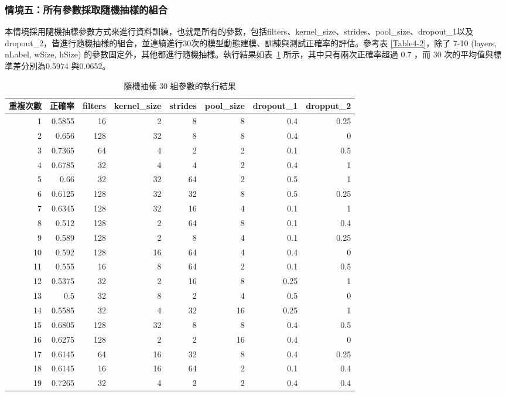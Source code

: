 \documentclass[12pt, a4paper]{article} 				%
\begin{document}
\subsubsection{情境五：所有參數採取隨機抽樣的組合}
本情境採用隨機抽樣參數方式來進行資料訓練，也就是所有的參數，包括filters、kernel\_size、strides、pool\_size、dropout\_1以及dropout\_2，皆進行隨機抽樣的組合，並連續進行30次的模型動態建模、訓練與測試正確率的評估。參考表 \ref{Table4-2}，除了 7-10  (layers, nLabel, wSize, hSize) 的參數固定外，其他都進行隨機抽樣。執行結果如表~\ref{Table4-9} 所示，其中只有兩次正確率超過 0.7 ，而 30 次的平均值與標準差分別為0.5974 與0.0652。

\begin{table}
\begin{center}
\caption{隨機抽樣 30 組參數的執行結果}\label{Table4-9}
\begin{tabular}{rrrrrrrr}\toprule
重複次數	&	正確率	&	filters	&	kernel\_size	&	strides	&	pool\_size	&	dropout\_1	&	dropput\_2	\\\midrule
1	&	0.5855	&	16	&	2	&	8	&	8	&	0.4	&	0.25	\\
2	&	0.656	&	128	&	32	&	8	&	8	&	0.4	&	0	\\
3	&	0.7365	&	64	&	4	&	2	&	2	&	0.1	&	0.5	\\
4	&	0.6785	&	32	&	4	&	4	&	2	&	0.4	&	1	\\
5	&	0.66	&	32	&	32	&	64	&	2	&	0.5	&	1	\\
6	&	0.6125	&	128	&	32	&	32	&	8	&	0.5	&	0.25	\\
7	&	0.6345	&	128	&	32	&	16	&	4	&	0.1	&	1	\\
8	&	0.512	&	128	&	2	&	64	&	8	&	0.1	&	0.4	\\
9	&	0.589	&	128	&	2	&	8	&	4	&	0.1	&	0.25	\\
10	&	0.592	&	128	&	16	&	64	&	4	&	0.4	&	0	\\
11	&	0.555	&	16	&	8	&	64	&	2	&	0.1	&	0.5	\\
12	&	0.5375	&	32	&	2	&	16	&	8	&	0.25	&	1	\\
13	&	0.5	&	32	&	8	&	2	&	4	&	0.5	&	0	\\
14	&	0.5585	&	32	&	4	&	32	&	16	&	0.25	&	1	\\
15	&	0.6805	&	128	&	32	&	8	&	8	&	0.4	&	0.5	\\
16	&	0.6275	&	128	&	2	&	2	&	16	&	0.4	&	0	\\
17	&	0.6145	&	64	&	16	&	32	&	8	&	0.4	&	0.25	\\
18	&	0.6145	&	16	&	16	&	64	&	2	&	0.1	&	0.4	\\
19	&	0.7265	&	32	&	4	&	2	&	2	&	0.4	&	0.4	\\

\end{tabular}
\end{center}
\end{table}
\end{document}
